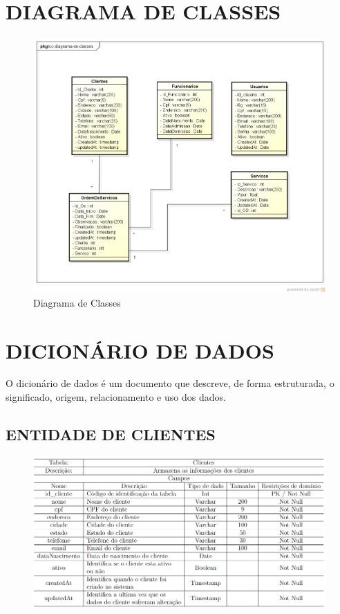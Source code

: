 \newpage
\section{DIAGRAMA DE CLASSES}
\begin{figure}[htb]
	\caption{\label{fig_diagrama-classes} Diagrama de Classes}
	\begin{center}
	    \includegraphics[width=1\linewidth]{imagens/diagrama-de-classes.png}
	\end{center}
\end{figure}

\newpage
\section{DICIONÁRIO DE DADOS}
O dicionário de dados é um documento que descreve, de forma estruturada, o significado, origem, relacionamento e uso dos dados.
\subsection{ENTIDADE DE CLIENTES}
\begin{figure}[htb]
	\begin{center}
	    \includegraphics[width=1\linewidth]{imagens/dc1.png}
	\end{center}
\end{figure}

